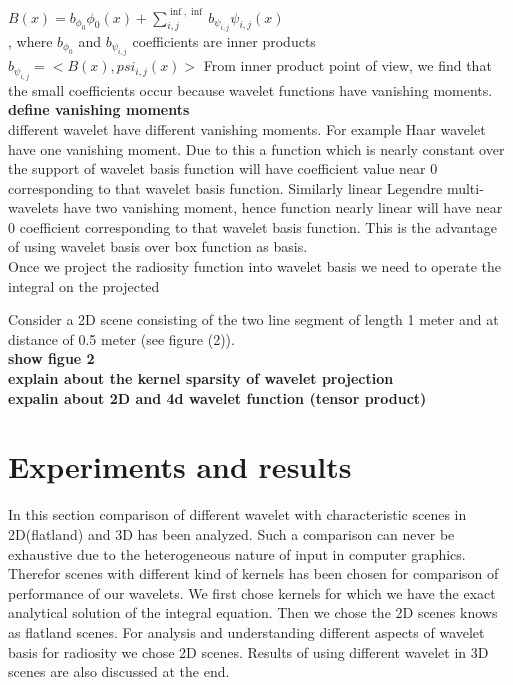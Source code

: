 \documentclass[12pt]{article}
\begin{document}
$B(x) = b_{\phi_0}\phi_0(x)+\sum_{i,j}^{\inf,\inf}b_{\psi_{i,j}}\psi_{i,j}(x)$\\,
where $b_{\phi_0}$ and $b_{\psi_{i,j}}$ coefficients are inner products\\
$b_{\psi_{i,j}}=<B(x),psi_{i,j}(x)>$
From inner product point of view, we find that the small coefficients occur because wavelet functions have vanishing moments.
{\bf define vanishing moments}\\

different wavelet have different vanishing moments. For example Haar wavelet have one vanishing moment. Due to this a function which is nearly constant over the support of wavelet basis function will have coefficient value near 0 corresponding to that wavelet basis function. Similarly linear Legendre multi-wavelets have two vanishing moment, hence function nearly linear will have near 0 coefficient corresponding to that wavelet basis function. This is the advantage of using wavelet basis over box function as basis.\\

Once we project the radiosity function into wavelet basis we need to operate the integral on the projected 

Consider a 2D scene consisting of the two line segment of length 1 meter and at distance of 0.5 meter (see figure (2)). \\

{\bf show figue 2}\\

{\bf explain about the kernel sparsity of wavelet projection }\\

{\bf expalin about 2D and 4d wavelet function (tensor product)}
\section{Experiments and results}
In this section comparison of different wavelet with characteristic scenes in 2D(flatland) and 3D has been analyzed. Such a comparison can never be exhaustive due to the heterogeneous nature of input in computer graphics. Therefor scenes with different kind of kernels has been chosen for comparison of performance of our wavelets. We first chose kernels for which we have the exact analytical solution of the integral equation. Then we chose the 2D scenes knows as flatland scenes. For analysis and understanding different aspects of wavelet basis for radiosity we chose 2D scenes. Results of using different wavelet in 3D scenes are also discussed at the end. \\
\end{document}
